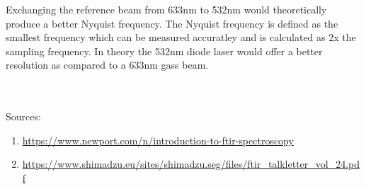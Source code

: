 \documentclass[titlepage]{article}
\begin{document}
\par Exchanging the reference beam from 633nm to 532nm would theoretically produce a better Nyquist frequency. The Nyquist frequency is defined as the smallest frequency which can be measured accuratley and is calculated as 2x the sampling frequency. In theory the 532nm diode laser would offer a better resolution as compared to a 633nm gass beam. \\ \\ \\ %

\begin{small}
    Sources:
    \begin{enumerate}
        \item  \url{https://www.newport.com/n/introduction-to-ftir-spectroscopy}
        \item \url{https://www.shimadzu.eu/sites/shimadzu.seg/files/ftir_talkletter_vol_24.pdf}
    \end{enumerate}
\end{small}
\newpage
\end{document}
